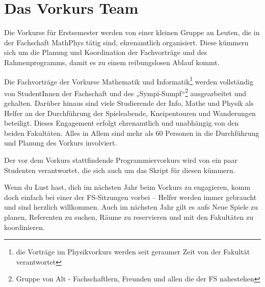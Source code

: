 \section{Das Vorkurs Team}
Die Vorkurse für Erstsemester werden von einer kleinen Gruppe an Leuten, die in der Fachschaft MathPhys tätig sind, ehrenamtlich organisiert. Diese kümmern sich um die Planung und Koordination der Fachvorträge und des Rahmenprogramms, damit es zu einem reibungslosen Ablauf kommt.

Die Fachvorträge der Vorkurse Mathematik und Informatik\footnote{die Vorträge im Physikvorkurs werden seit geraumer Zeit von der Fakultät verantwortet} werden vollständig von StudentInnen der Fachschaft und des „Sympi-Sumpf“\footnote{Gruppe von Alt - Fachschaftlern, Freunden und allen die der FS nahestehen} ausgearbeitet und gehalten. Darüber hinaus sind viele Studierende der Info, Mathe und Physik als Helfer an der Durchführung der Spieleabende, Kneipentouren und Wanderungen beteiligt. Dieses Engagement erfolgt ehrenamtlich und unabhängig von den beiden Fakultäten. Alles in Allem sind mehr als 60 Personen in die Durchführung und Planung des Vorkurs involviert.

Der vor dem Vorkurs stattfindende Programmiervorkurs wird von ein paar Studenten verantwortet, die sich auch um das Skript für diesen kümmern.

Wenn du Lust hast, dich im nächsten Jahr beim Vorkurs zu engagieren, komm doch einfach bei einer der FS-Sitzungen vorbei -- Helfer werden immer gebraucht und sind herzlich willkommen. Auch im nächsten Jahr gilt es aufs Neue Spiele zu planen, Referenten zu suchen, Räume zu reservieren und mit den Fakultäten zu koordinieren.

\phantom{korrigiert Dinge, ohne an mathphyssecnobar zu fummeln.}
